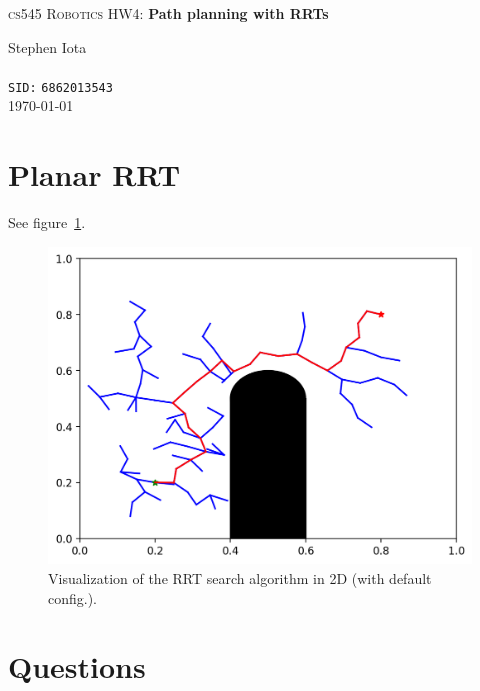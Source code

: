 \documentclass{article}
\begin{document}
    \begin{center}
        {\LARGE \textsc{cs545 Robotics HW4:} \textbf{Path planning with RRTs}}
    \end{center}

    \bigbreak

    \begin{center}
        Stephen Iota%
        \\
        \\
        \texttt{SID:} \texttt{6862013543}
        \\
        \today
    \end{center}

    \bigbreak

    \section*{Planar RRT}
    See figure~\ref{fig:planar_rrt}.

    \begin{figure}[p]
        \centering
        \includegraphics[width=0.8\linewidth]{planar_rrt.png}
        \caption{Visualization of the RRT search algorithm in 2D (with default config.).}
        \label{fig:planar_rrt}
    \end{figure}

    \section*{Questions}
\end{document}
